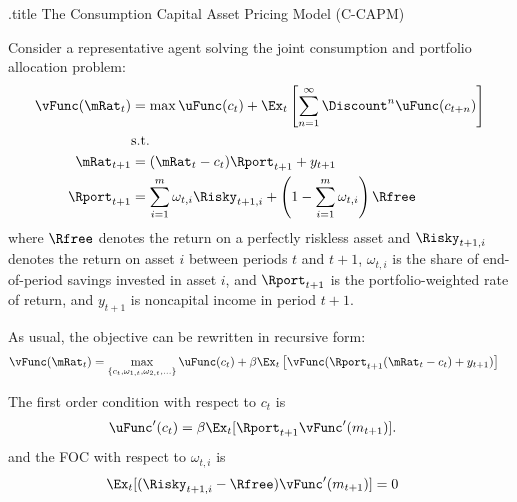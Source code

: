 \documentclass{handout}
\begin{document}
\handoutHeader

\begin{verbatimwrite}{\jobname.title}
The Consumption Capital Asset Pricing Model (C-CAPM)
\end{verbatimwrite}

\handoutNameMake

Consider a representative agent solving the joint consumption and 
portfolio allocation problem:
\begin{equation}\begin{gathered}\begin{aligned}
        \vFunc(\mRat_{t}) & =  \max \uFunc(c_{t}) + \Ex_{t}\left[\sum_{n=1}^{\infty} \Discount^{n} \uFunc(c_{t+n}) \right]
\\  & \text{s.t.}  \nonumber
\\      \mRat_{t+1} & =  (\mRat_{t}-c_{t})\Rport_{t+1} + y_{t+1}  
\\      \Rport_{t+1} & =  \sum_{i=1}^{m}\omega_{t,i}\Risky_{t+1,i}+\left(1-\sum_{i=1}^{m} \omega_{t,i}\right)\Rfree
\end{aligned}\end{gathered}\end{equation}
where $\Rfree$ denotes the return on a perfectly riskless asset and 
$\Risky_{t+1,i}$ denotes the return on asset $i$ between periods $t$ and 
$t+1$, $\omega_{t,i}$ is the share of end-of-period savings invested in 
asset $i$, and $\Rport_{t+1}$ is the portfolio-weighted rate of 
return, and $y_{t+1}$ is noncapital income in period $t+1$.

As usual, the objective can be rewritten in recursive form:
\begin{equation}\begin{gathered}\begin{aligned}
        \vFunc(\mRat_{t}) & =  \max_{\{c_{t},\omega_{1,t},\omega_{2,t},\ldots\}} \uFunc(c_{t}) +\beta \Ex_{t}\left[\vFunc(\Rport_{t+1}(\mRat_{t}-c_{t})+{y}_{t+1})\right]
\end{aligned}\end{gathered}\end{equation}

The first order condition with respect to $c_{t}$ is
\begin{equation}\begin{gathered}\begin{aligned}
        \uFunc^{\prime}(c_{t}) & =  \beta \Ex_{t}[\Rport_{t+1}\vFunc^{\prime}({m}_{t+1})] \label{eq:cfoc}.
\end{aligned}\end{gathered}\end{equation}
and the FOC with respect to $\omega_{t,i}$ is
\begin{equation}\begin{gathered}\begin{aligned}
        \Ex_{t}[(\Risky_{t+1,i}-\Rfree)\vFunc^{\prime}({m}_{t+1})] & =  0 \label{eq:gamfoc}
\end{aligned}\end{gathered}\end{equation}
\end{document}
